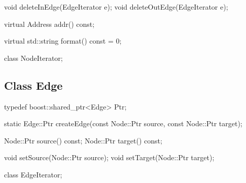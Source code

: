 \begin{apient}
void deleteInEdge(EdgeIterator e);
void deleteOutEdge(EdgeIterator e);
\end{apient}

\begin{apient}
virtual Address addr() const;
\end{apient}

\begin{apient}
virtual std::string format() const = 0;
\end{apient}

\begin{apient}
class NodeIterator;
\end{apient}


\subsection{Class Edge}

\begin{apient}
typedef boost::shared_ptr<Edge> Ptr;
\end{apient}

\begin{apient}
static Edge::Ptr createEdge(const Node::Ptr source, const Node::Ptr target);
\end{apient}

\begin{apient}
Node::Ptr source() const;
Node::Ptr target() const;
\end{apient}

\begin{apient}
void setSource(Node::Ptr source);
void setTarget(Node::Ptr target);
\end{apient}

\begin{apient}
class EdgeIterator;
\end{apient}

